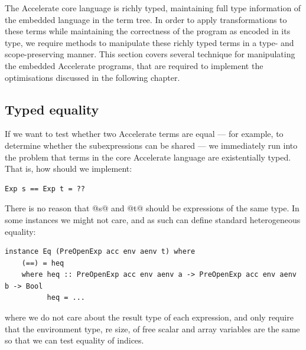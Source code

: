 The Accelerate core language is richly typed, maintaining full type information
of the embedded language in the term tree. In order to apply transformations to
these terms while maintaining the correctness of the program as encoded in its
type, we require methods to manipulate these richly typed terms in a type- and
scope-preserving manner. This section covers several technique for manipulating
the embedded Accelerate programs, that are required to implement the
optimisations discussed in the following chapter.


\subsection{Typed equality}
\label{sec:equality}

If we want to test whether two Accelerate terms are equal --- for example, to
determine whether the subexpressions can be shared --- we immediately run into
the problem that terms in the core Accelerate language are existentially typed.
That is, how should we implement:
%
\begin{lstlisting}[style=haskell]
Exp s == Exp t = ??
\end{lstlisting}
%
There is no reason that @s@ and @t@ should be expressions of the same
type. In some instances we might not care, and as such can define standard
heterogeneous equality:
%
\begin{lstlisting}[style=haskell]
instance Eq (PreOpenExp acc env aenv t) where
    (==) = heq
    where heq :: PreOpenExp acc env aenv a -> PreOpenExp acc env aenv b -> Bool
          heq = ...
\end{lstlisting}
%
where we do not care about the result type of each expression, and only require
that the environment type, re size, of free scalar and array variables are the
same so that we can test equality of  indices.

